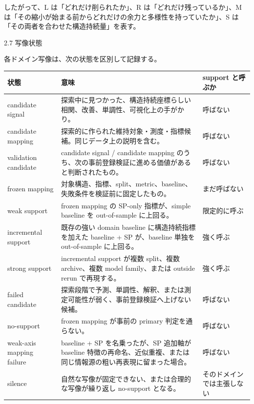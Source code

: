 \documentclass[12pt,a4paper]{article}
\begin{document}
したがって、L は「どれだけ削られたか」、R は「どれだけ残っているか」、M は「その縮小が始まる前からどれだけの余力と多様性を持っていたか」、S は「その両者を合わせた構造持続量」を表す。

2.7 写像状態

各ドメイン写像は、次の状態を区別して記録する。

{\def\LTcaptype{table} %
\begin{longtable}[]{@{}
  >{\raggedright\arraybackslash}p{}
  >{\raggedright\arraybackslash}p{}
  >{\raggedright\arraybackslash}p{}@{}}
\toprule\noalign{}
\begin{minipage}[b]{\linewidth}\raggedright
状態
\end{minipage} & \begin{minipage}[b]{\linewidth}\raggedright
意味
\end{minipage} & \begin{minipage}[b]{\linewidth}\raggedright
support と呼ぶか
\end{minipage} \\
\midrule\noalign{}
\endhead
\bottomrule\noalign{}
\endlastfoot
candidate signal & 探索中に見つかった、構造持続座標らしい相関、改善、単調性、可視化上の手がかり。 & 呼ばない \\
candidate mapping & 探索的に作られた維持対象・測度・指標候補。同じデータ上の説明を含む。 & 呼ばない \\
validation candidate & candidate signal / candidate mapping のうち、次の事前登録検証に進める価値があると判断されたもの。 & 呼ばない \\
frozen mapping & 対象構造、指標、split、metric、baseline、失敗条件を検証前に固定したもの。 & まだ呼ばない \\
weak support & frozen mapping の SP-only 指標が、simple baseline を out-of-sample に上回る。 & 限定的に呼ぶ \\
incremental support & 既存の強い domain baseline に構造持続指標を加えた baseline + SP が、baseline 単独を out-of-sample に上回る。 & 強く呼ぶ \\
strong support & incremental support が複数 split、複数 archive、複数 model family、または outside rerun で再現する。 & 強く呼ぶ \\
failed candidate & 探索段階で予測、単調性、解釈、または測定可能性が弱く、事前登録検証へ上げない候補。 & 呼ばない \\
no-support & frozen mapping が事前の primary 判定を通らない。 & 呼ばない \\
weak-axis mapping failure & baseline + SP を名乗ったが、SP 追加軸が baseline 特徴の再命名、近似重複、または同じ情報源の粗い再表現に留まった場合。 & 呼ばない \\
silence & 自然な写像が固定できない、または合理的な写像が繰り返し no-support となる。 & そのドメインでは主張しない \\
\end{longtable}
}
\end{document}
